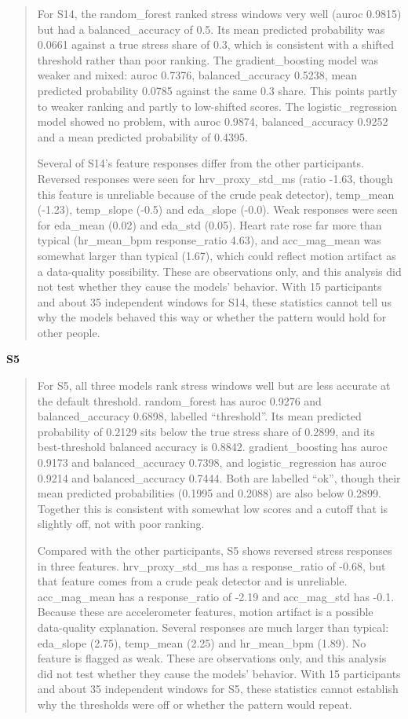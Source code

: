\documentclass[11pt]{article}
\begin{document}
\begin{quote}
For S14, the random\_forest ranked stress windows very well (auroc
0.9815) but had a balanced\_accuracy of 0.5. Its mean predicted
probability was 0.0661 against a true stress share of 0.3, which is
consistent with a shifted threshold rather than poor ranking. The
gradient\_boosting model was weaker and mixed: auroc 0.7376,
balanced\_accuracy 0.5238, mean predicted probability 0.0785 against the
same 0.3 share. This points partly to weaker ranking and partly to
low-shifted scores. The logistic\_regression model showed no problem,
with auroc 0.9874, balanced\_accuracy 0.9252 and a mean predicted
probability of 0.4395.

Several of S14's feature responses differ from the other participants.
Reversed responses were seen for hrv\_proxy\_std\_ms (ratio -1.63,
though this feature is unreliable because of the crude peak detector),
temp\_mean (-1.23), temp\_slope (-0.5) and eda\_slope (-0.0). Weak
responses were seen for eda\_mean (0.02) and eda\_std (0.05). Heart rate
rose far more than typical (hr\_mean\_bpm response\_ratio 4.63), and
acc\_mag\_mean was somewhat larger than typical (1.67), which could
reflect motion artifact as a data-quality possibility. These are
observations only, and this analysis did not test whether they cause the
models' behavior. With 15 participants and about 35 independent windows
for S14, these statistics cannot tell us why the models behaved this way
or whether the pattern would hold for other people.
\end{quote}

\textbf{S5}

\begin{quote}
For S5, all three models rank stress windows well but are less accurate
at the default threshold. random\_forest has auroc 0.9276 and
balanced\_accuracy 0.6898, labelled ``threshold''. Its mean predicted
probability of 0.2129 sits below the true stress share of 0.2899, and
its best-threshold balanced accuracy is 0.8842. gradient\_boosting has
auroc 0.9173 and balanced\_accuracy 0.7398, and logistic\_regression has
auroc 0.9214 and balanced\_accuracy 0.7444. Both are labelled ``ok'',
though their mean predicted probabilities (0.1995 and 0.2088) are also
below 0.2899. Together this is consistent with somewhat low scores and a
cutoff that is slightly off, not with poor ranking.

Compared with the other participants, S5 shows reversed stress responses
in three features. hrv\_proxy\_std\_ms has a response\_ratio of -0.68,
but that feature comes from a crude peak detector and is unreliable.
acc\_mag\_mean has a response\_ratio of -2.19 and acc\_mag\_std has
-0.1. Because these are accelerometer features, motion artifact is a
possible data-quality explanation. Several responses are much larger
than typical: eda\_slope (2.75), temp\_mean (2.25) and hr\_mean\_bpm
(1.89). No feature is flagged as weak. These are observations only, and
this analysis did not test whether they cause the models' behavior. With
15 participants and about 35 independent windows for S5, these
statistics cannot establish why the thresholds were off or whether the
pattern would repeat.
\end{quote}
\end{document}
